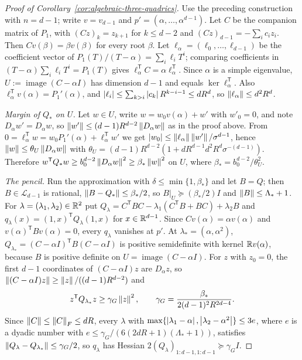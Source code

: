 \begin{proof}[Proof of Corollary~\ref{cor:algebraic-three-quadrics}]
Use the preceding construction with $n=d-1$; write $v=v_{d-1}$ and
$p'=(\alpha,\ldots,\alpha^{d-1})$. Let $C$ be the companion matrix of $P_1$,
with $(Cz)_k=z_{k+1}$ for $k\le d-2$ and $(Cz)_{d-1}=-\sum_ic_iz_i$. Then
$Cv(\beta)=\beta v(\beta)$ for every root $\beta$. Let
$\ell_\alpha=(\ell_0,\ldots,\ell_{d-1})$ be the coefficient vector of
$P_1(T)/(T-\alpha)=\sum_i\ell_iT^i$; comparing coefficients in
$(T-\alpha)\sum_i\ell_iT^i=P_1(T)$ gives $\ell_\alpha^{\mathsf
T}C=\alpha\ell_\alpha^{\mathsf T}$. Since $\alpha$ is a simple eigenvalue,
$U:=\operatorname{image}(C-\alpha I)$ has dimension $d-1$ and equals
$\ker\ell_\alpha^{\mathsf T}$. Also $\ell_\alpha^{\mathsf
T}v(\alpha)=P_1'(\alpha)$, and $\left\lvert\ell_i\right\rvert\le\sum_{k>i}\left\lvert c_k\right\rvert R^{k-i-1}\le
dR^d$, so $\left\lVert\ell_\alpha\right\rVert\le d^2R^d$.

\emph{Margin of $Q_*$ on $U$.} Let $w\in U$, write $w=w_0v(\alpha)+w'$ with
$w'_0=0$, and note $D_\alpha w'=D_\alpha w$, so
$\left\lVert w'\right\rVert\le(d-1)R^{d-2}\left\lVert D_\alpha w\right\rVert$ as in the proof above. From
$0=\ell_\alpha^{\mathsf T}w=w_0P_1'(\alpha)+\ell_\alpha^{\mathsf T}w'$ we get
$\left\lvert w_0\right\rvert\le\left\lVert\ell_\alpha\right\rVert\left\lVert w'\right\rVert/\sigma^{d-1}$, hence
$\left\lVert w\right\rVert\le\theta_U\left\lVert D_\alpha w\right\rVert$ with
$\theta_U=(d-1)R^{d-2}(1+dR^{d-1}d^2R^d\sigma^{-(d-1)})$. Therefore
$w^{\mathsf T}Q_*w\ge b_0^{d-2}\left\lVert D_\alpha w\right\rVert^2\ge\beta_*\left\lVert w\right\rVert^2$ on $U$,
where $\beta_*=b_0^{d-2}/\theta_U^2$.

\emph{The pencil.} Run the approximation with
$\delta\le\min\{1,\beta_*\}$ and let $B=Q$; then $B\in\mathcal L_{d-1}$ is
rational, $\left\lVert B-Q_*\right\rVert\le\beta_*/2$, so $B|_U\succeq(\beta_*/2)I$ and
$\left\lVert B\right\rVert\le\Lambda_*+1$. For $\lambda=(\lambda_1,\lambda_2)\in\mathbb R^2$ put
$Q_\lambda=C^{\mathsf T}BC-\lambda_1(C^{\mathsf T}B+BC)+\lambda_2B$ and
$q_\lambda(x)=(1,x)^{\mathsf T}Q_\lambda(1,x)$ for $x\in\mathbb R^{d-1}$. Since
$Cv(\alpha)=\alpha v(\alpha)$ and $v(\alpha)^{\mathsf T}Bv(\alpha)=0$, every
$q_\lambda$ vanishes at $p'$. At $\lambda_*=(\alpha,\alpha^2)$,
$Q_{\lambda_*}=(C-\alpha I)^{\mathsf T}B(C-\alpha I)$ is positive semidefinite
with kernel $\mathbb R v(\alpha)$, because $B$ is positive definite on
$U=\operatorname{image}(C-\alpha I)$. For $z$ with $z_0=0$, the first $d-1$
coordinates of $(C-\alpha I)z$ are $D_\alpha z$, so
$\left\lVert(C-\alpha I)z\right\rVert\ge\left\lVert z\right\rVert/((d-1)R^{d-2})$ and
\[
 z^{\mathsf T}Q_{\lambda_*}z\ge\gamma_G\left\lVert z\right\rVert^2,\qquad
 \gamma_G=\frac{\beta_*}{2(d-1)^2R^{2d-4}} .
\]
Since $\left\lVert C\right\rVert\le\left\lVert C\right\rVert_F\le dR$, every $\lambda$ with
$\max\{\left\lvert\lambda_1-\alpha\right\rvert,\left\lvert\lambda_2-\alpha^2\right\rvert\}\le3e$, where $e$ is a
dyadic number with $e\le\gamma_G/(6(2dR+1)(\Lambda_*+1))$, satisfies
$\left\lVert Q_\lambda-Q_{\lambda_*}\right\rVert\le\gamma_G/2$, so $q_\lambda$ has Hessian
$2(Q_\lambda)_{1:d-1,1:d-1}\succeq\gamma_GI$.


\end{proof}
